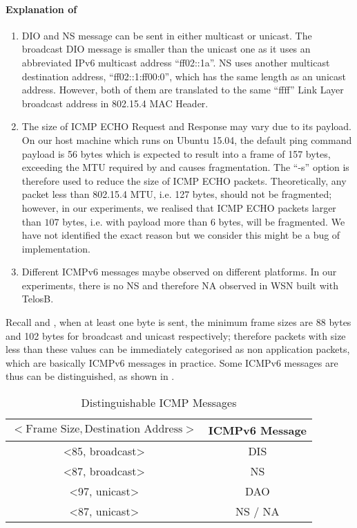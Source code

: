 \paragraph{Explanation of }
\begin{enumerate}
	\item DIO and NS message can be sent in either multicast or unicast. The broadcast DIO message is smaller than the unicast one as it uses an abbreviated IPv6 multicast address ``ff02::1a''. NS uses another multicast destination address, ``ff02::1:ff00:0'', which has the same length as an unicast address. However, both of them are translated to the same ``ffff'' Link Layer broadcast address in 802.15.4 MAC Header.
	\item The size of ICMP ECHO Request and Response may vary due to its payload. On our host machine which runs on Ubuntu 15.04, the default ping command payload is 56 bytes which is expected to result into a frame of 157 bytes, exceeding the MTU required by \cite{802154} and causes fragmentation. The ``-s'' option is therefore used to reduce the size of ICMP ECHO packets. Theoretically, any packet less than 802.15.4 MTU, i.e. 127 bytes, should not be fragmented; however, in our experiments, we realised that ICMP ECHO packets larger than $107$ bytes, i.e. with payload more than $6$ bytes, will be fragmented. We have not identified the exact reason but we consider this might be a bug of implementation.
	\item Different ICMPv6 messages maybe observed on different platforms. In our experiments, there is no NS and therefore NA observed in WSN built with TelosB.
\end{enumerate}

Recall  and , when at least one byte is sent, the minimum frame sizes are 88 bytes and 102 bytes for broadcast and unicast respectively; therefore packets with size less than these values can be immediately categorised as non application packets, which are basically ICMPv6 messages in practice. Some ICMPv6 messages are thus can be distinguished, as shown in .

\begin{table}[ht!]
	\centering
	\begin{tabular}{|c|c|}
		\hline
		$<\text{Frame Size}, \text{Destination Address}>$                     & ICMPv6 Message \\ \hline
		\textless85, broadcast\textgreater & DIS            \\ \hline
		\textless87, broadcast\textgreater & NS             \\ \hline
		\textless97, unicast\textgreater   & DAO            \\ \hline
		\textless87, unicast\textgreater   & NS / NA        \\ \hline
	\end{tabular}
	\caption{Distinguishable ICMP Messages}
	\label{Tbl: Distinguishable ICMP Messages}
\end{table}

